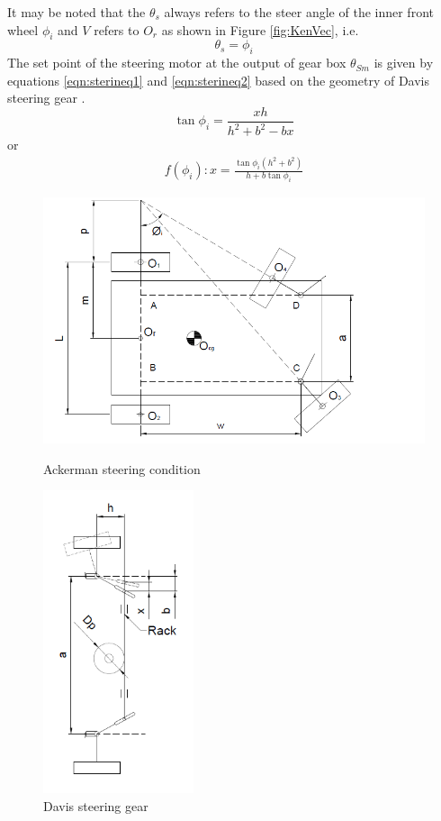  It may be noted that the $\theta_s$ always refers to the steer angle of the inner front wheel $\phi_i$  and $V$ refers to $O_r$ as shown in Figure \ref{fig:KenVec}, i.e.
 \begin{equation}
	 \theta_s =\phi_i
 \end{equation}
 The set point of the steering motor at the output of  gear box $\theta_{Sm}$ is given by equations \ref{eqn:sterineq1} and \ref{eqn:sterineq2}  based on the geometry of Davis steering gear \cite{TOMBook}.
\begin{equation*}
 \tan\phi_i=\frac{xh}{h^2+b^2-bx}
\end{equation*}
or
\begin{eqnarray}
f(\phi_i): x=\frac{\tan\phi_i (h^2+b^2)}{h+b \tan\phi_i }
\label{eqn:sterineq1}
\end{eqnarray}
\begin{figure}
	\begin{minipage}[t]{0.6\textwidth}
		\centering
		\includegraphics[width=5in]{Chapter5/fig/kinvec} 
		\caption{Ackerman steering condition}\label{fig:KenVec}
	\end{minipage}
	\begin{minipage}[t]{0.7\textwidth}
		\centering
		\includegraphics[height=3.5in]{Chapter5/fig/davisgear} 
		\caption{Davis steering gear}\label{fig:steering_gear_train}
	\end{minipage}
\end{figure}
